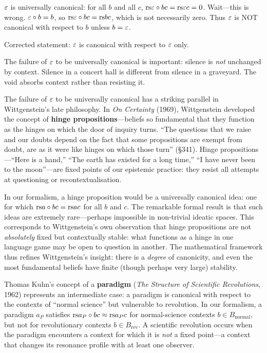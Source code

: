 \begin{theorem}
\label{thm:void-canonical}
$\varepsilon$ is universally canonical: for all $b$ and all $c$,
$\mathrm{rs}{\varepsilon \circ b}{c} = \mathrm{rs}{\varepsilon}{c} = 0$.
Wait---this is wrong.  $\varepsilon \circ b = b$, so
$\mathrm{rs}{\varepsilon \circ b}{c} = \mathrm{rs}{b}{c}$, which is not necessarily zero.
Thus $\varepsilon$ is NOT canonical with respect to $b$ unless $b = \varepsilon$.

Corrected statement: $\varepsilon$ is canonical with respect to $\varepsilon$ only.
\end{theorem}

\begin{remark}
The failure of $\varepsilon$ to be universally canonical is important: silence is
\emph{not} unchanged by context.  Silence in a concert hall is different from
silence in a graveyard.  The void absorbs context rather than resisting it.
\end{remark}


\begin{interpretation}
\label{interp:ch10:wittgenstein_hinge}
The failure of $\varepsilon$ to be universally canonical has a striking parallel
in Wittgenstein's late philosophy.  In \emph{On Certainty} (1969),
Wittgenstein developed the concept of \textbf{hinge propositions}---beliefs
so fundamental that they function as the hinges on which the door of inquiry
turns.  ``The questions that we raise and our doubts depend on the fact that
some propositions are exempt from doubt, are as it were like hinges on which
those turn'' (\S341).  Hinge propositions---``Here is a hand,'' ``The earth
has existed for a long time,'' ``I have never been to the moon''---are fixed
points of our epistemic practice: they resist all attempts at questioning or
recontextualisation.

In our formalism, a hinge proposition would be a universally canonical idea:
one for which $\mathrm{rs}{a \circ b}{c} = \mathrm{rs}{a}{c}$ for all $b$ and $c$.  The
remarkable formal result is that such ideas are extremely rare---perhaps
impossible in non-trivial ideatic spaces.  This corresponds to Wittgenstein's
own observation that hinge propositions are not \emph{absolutely} fixed but
contextually stable: what functions as a hinge in one language game may be
open to question in another.  The mathematical framework thus refines
Wittgenstein's insight: there is a \emph{degree} of canonicity, and even the
most fundamental beliefs have finite (though perhaps very large) stability.

Thomas Kuhn's concept of a \textbf{paradigm} (\emph{The Structure of
Scientific Revolutions}, 1962) represents an intermediate case: a paradigm
is canonical with respect to the contexts of ``normal science'' but
vulnerable to revolution.  In our formalism, a paradigm $a_P$ satisfies
$\mathrm{rs}{a_P \circ b}{c} \approx \mathrm{rs}{a_P}{c}$ for normal-science contexts
$b \in B_{\mathrm{normal}}$, but not for revolutionary contexts
$b \in B_{\mathrm{rev}}$.  A scientific revolution occurs when the paradigm
encounters a context for which it is \emph{not} a fixed point---a context
that changes its resonance profile with at least one observer.
\end{interpretation}


